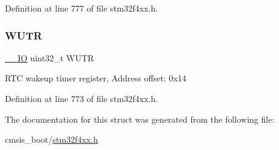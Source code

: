 Definition at line 777 of file stm32f4xx.\+h.

\mbox{\label{struct_r_t_c___type_def_ac5b3c8be61045a304d3076d4714d29f2}} 
\subsubsection{\texorpdfstring{W\+U\+TR}{WUTR}}
{\footnotesize\ttfamily \hyperlink{group___c_m_s_i_s__core__definitions_gaec43007d9998a0a0e01faede4133d6be}{\+\_\+\+\_\+\+IO} uint32\+\_\+t W\+U\+TR}

R\+TC wakeup timer register, Address offset\+: 0x14 

Definition at line 773 of file stm32f4xx.\+h.



The documentation for this struct was generated from the following file\+:\begin{DoxyCompactItemize}
\item 
cmsis\+\_\+boot/\hyperlink{stm32f4xx_8h}{stm32f4xx.\+h}\end{DoxyCompactItemize}
